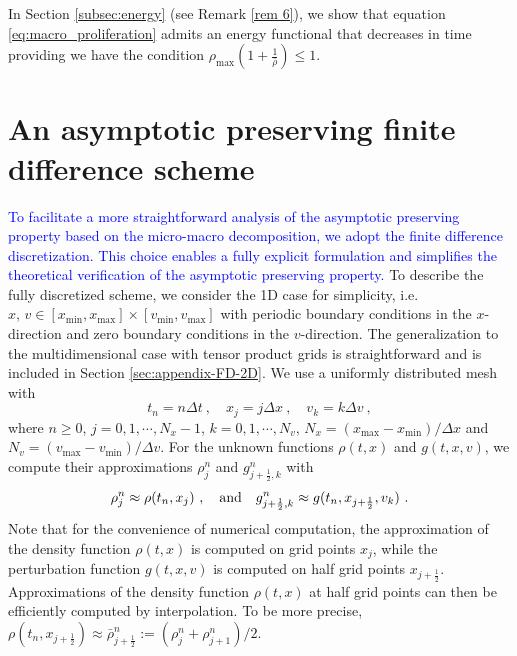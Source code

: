 \documentclass{article}
\newcommand {\dx}   {\Delta x}
\begin{document}
{In Section \ref{subsec:energy} (see Remark \ref{rem 6}), we show that equation \eqref{eq:macro_proliferation} admits an energy functional that decreases in time providing we have the condition $\rho_{\max} (1 + \frac{1}{\bar{\rho}}) \leq 1$}. 

\section{An asymptotic preserving finite difference scheme}\label{sec: implicit-explicit scheme}
\textcolor{blue}{To facilitate a more straightforward analysis of the asymptotic preserving property based on the micro-macro decomposition, we adopt the finite difference discretization. This choice enables a fully explicit formulation and simplifies the theoretical verification of the asymptotic preserving property.}
To describe the fully discretized scheme, we consider the 1D case for simplicity, i.e. {$x, \,v \in [x_{\min}, x_{\max}]\times [v_{\min}, v_{\max}]$ with periodic boundary conditions in the $x$-direction and zero boundary conditions in the $v$-direction.} The generalization to
the multidimensional case with tensor product grids is straightforward and is included in  Section \ref{sec:appendix-FD-2D}. We use a uniformly distributed mesh with 
\begin{equation*}
    t_n = n \Delta t\ , \quad x_j = j \dx\ , \quad v_k = k \Delta v\  ,
\end{equation*}
where $n\ge0$, $j=0,1,\cdots, N_x-1$, $k=0,1,\cdots, N_v$, $N_x = (x_{\max} - x_{\min}) / \Delta x$ and $N_v = (v_{\max} - v_{\min}) / \Delta v$. 
For the unknown functions $\rho(t,x)$ and $g(t,x,v)$, we compute {{their}} approximations $\rho_j^n$ and $g^n_{j+\frac{1}{2},k}$ with 
\begin{equation*}
  \rho_j^n\approx\rho(t_n,x_j)\ ,\quad\textnormal{and} \quad  
  g^n_{j+\frac{1}{2},k}\approx g(t_n,x_{j+\frac{1}{2}},v_k)\ . 
\end{equation*}
Note that for the convenience of numerical computation, the approximation of the density function $\rho(t,x)$ is computed on grid points $x_j$, while the perturbation function $g(t,x,v)$ is computed on half grid points $x_{j+\frac12}$. 
Approximations of the density function $\rho(t,x)$ at half grid points can then be  efficiently computed by interpolation. 
To be more precise,  $\rho(t_n,x_{j+\frac12}) \approx \bar{\rho}_{j+\frac12}^n:=(\rho_j^n + \rho_{j+1}^n)/2$. 
\end{document}
